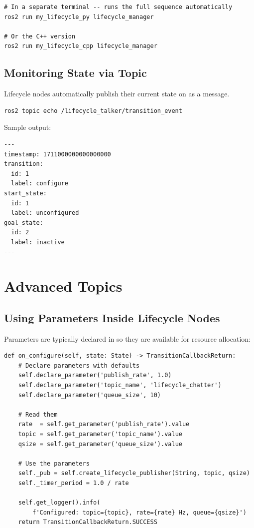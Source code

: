 \documentclass[11pt,a4paper]{csarticle}
\begin{document}
\begin{lstlisting}[style=bash,caption={Run the lifecycle manager}]
# In a separate terminal -- runs the full sequence automatically
ros2 run my_lifecycle_py lifecycle_manager

# Or the C++ version
ros2 run my_lifecycle_cpp lifecycle_manager
\end{lstlisting}

\subsection{Monitoring State via Topic}

Lifecycle nodes automatically publish their current state on
 as a
 message.

\begin{lstlisting}[style=bash,caption={Monitor state transitions}]
ros2 topic echo /lifecycle_talker/transition_event
\end{lstlisting}

Sample output:
\begin{lstlisting}[style=bash]
---
timestamp: 1711000000000000000
transition:
  id: 1
  label: configure
start_state:
  id: 1
  label: unconfigured
goal_state:
  id: 2
  label: inactive
---
\end{lstlisting}

\section{Advanced Topics}
\label{sec:advanced}

\subsection{Using Parameters Inside Lifecycle Nodes}

Parameters are typically declared in  so they are
available for resource allocation:

\begin{lstlisting}[style=python,caption={Declaring parameters in on\_configure (Python)}]
def on_configure(self, state: State) -> TransitionCallbackReturn:
    # Declare parameters with defaults
    self.declare_parameter('publish_rate', 1.0)
    self.declare_parameter('topic_name', 'lifecycle_chatter')
    self.declare_parameter('queue_size', 10)

    # Read them
    rate  = self.get_parameter('publish_rate').value
    topic = self.get_parameter('topic_name').value
    qsize = self.get_parameter('queue_size').value

    # Use the parameters
    self._pub = self.create_lifecycle_publisher(String, topic, qsize)
    self._timer_period = 1.0 / rate

    self.get_logger().info(
        f'Configured: topic={topic}, rate={rate} Hz, queue={qsize}')
    return TransitionCallbackReturn.SUCCESS
\end{lstlisting}
\end{document}
